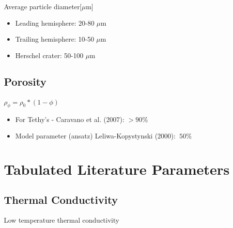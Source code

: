 \documentclass[11pt]{article} %
\begin{document}
	Average particle diameter[$\mu$m]
	\begin{itemize}
	\item Leading hemisphere: 20-80 $\mu$m
	\item Trailing hemisphere: 10-50 $\mu$m
	\item Herschel crater: 50-100 $\mu$m
	\end{itemize}

\subsection{Porosity}
\label{sec:porosity}

	$\rho_{\phi} = \rho_{0}*(1-\phi)$

	\begin{itemize}
	\item For Tethy's - Caravano et al. (2007): $>90\%$ 
	\item Model parameter (ansatz) Leliwa-Kopystynski (2000): $~50\%$
	\end{itemize}

\section{Tabulated Literature Parameters}
\label{sec:tabulated}
	
\subsection{Thermal Conductivity}
\label{sec:tconductivity}
	
	Low temperature thermal conductivity
	
\end{document}
